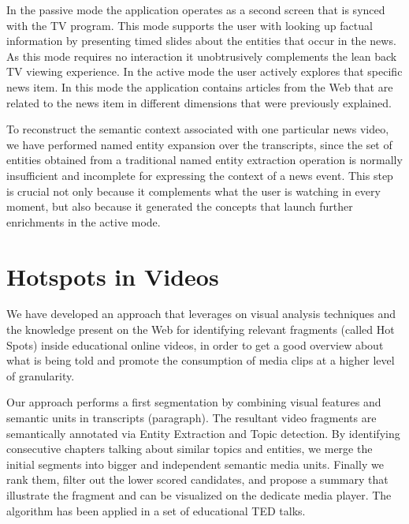 \documentclass[a4paper,11pt]{report}
\begin{document}
In the passive mode the application operates as a second screen that is synced with the TV program. This mode supports the user with looking up factual information by presenting timed slides about the entities that occur in the news. As this mode requires no interaction it unobtrusively complements the lean back TV viewing experience. In the active mode the user actively explores that specific news item. In this mode the application contains articles from the Web that are related to the news item in different dimensions that were previously explained.

To reconstruct the semantic context associated with one particular news video, we have performed named entity expansion over the transcripts, since the set of entities obtained from a traditional named entity extraction operation is normally insufficient and incomplete for expressing the context of a news event. This step is crucial not only because it complements what the user is watching in every moment, but also because it generated the concepts that launch further enrichments in the active mode. 

\section* {Hotspots in Videos}
\label{hotspots}

We have developed an approach that leverages on visual analysis techniques and the knowledge present on the Web for identifying relevant fragments (called Hot Spots) inside educational online videos, in order to get a good overview about what is being told and promote the consumption of media clips at a higher level of granularity. 

Our approach performs a first segmentation by combining visual features and semantic units in transcripts (paragraph). The resultant video fragments are semantically annotated via Entity Extraction and Topic detection. By identifying consecutive chapters talking about similar topics and entities, we merge the initial segments into bigger and independent semantic media units. Finally we rank them, filter out the lower scored candidates, and propose a summary that illustrate the fragment and can be visualized on the dedicate media player. The algorithm has been applied in a set of educational TED talks. 
\end{document}

